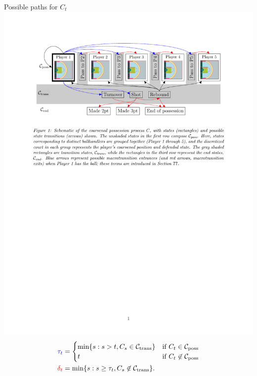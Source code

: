 \documentclass[10pt]{beamer}
\newcommand{\Cset}{\mathcal{C}}
\begin{document}
\begin{frame}{Possible paths for $C_t$}
\includegraphics[trim=60 520 60 40,clip,width=\textwidth]{graphics/Ct_standalone}
\pause
\begin{align*}
\color{blue}{\tau_t} & = \begin{cases}
\text{min} \{ s : s > t, C_s \in \Cset_{\text{trans}}\} & \text{if } C_t \in \Cset_{\text{poss}} \\
t & \text{if } C_t \not \in \Cset_{\text{poss}}
\end{cases}  \\
\color{red} {\delta_t}  &= \text{min}\{s : s \geq \tau_t, C_s \not \in \Cset_{\text{trans}} \}.
\end{align*}

\end{frame}
\end{document}
